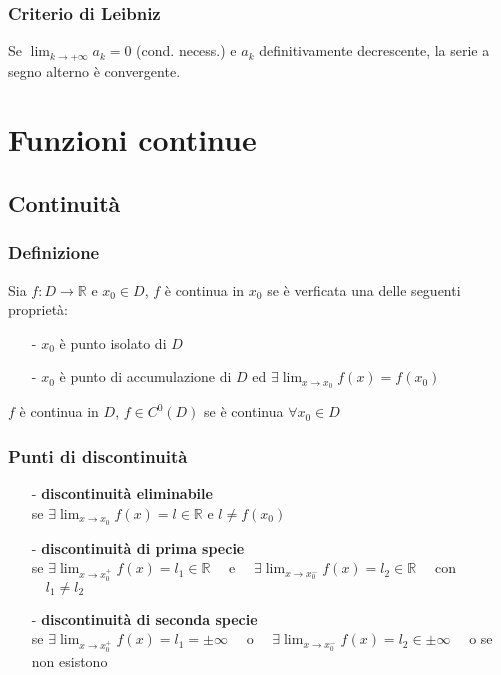 \documentclass[a4paper]{article}
\newcommand\cont[2]{C^{#1} \left({#2}\right)}
\begin{document}
\subsubsection*{Criterio di Leibniz}
Se \(\displaystyle \lim_{k \to +\infty} a_k = 0\) (cond. necess.) e \(a_k\) definitivamente decrescente, la serie a segno alterno è convergente.

\newpage


\section{Funzioni continue}
\subsection{Continuità}
\subsubsection*{Definizione}
Sia \(f:D \to \mathbb{R}\) e \(x_0 \in D\), \(f\) è continua in \(x_0\) se è verficata una delle seguenti proprietà:
\begin{itemize}
	\item[-] \(x_0\) è punto isolato di \(D\)
	\item[-] \(x_0\) è punto di accumulazione di \(D\) ed \(\displaystyle \exists \lim_{x \to x_0} f(x) = f(x_0)\)
\end{itemize}
\(f\) è continua in \(D\), \(f \in \cont{0}{D}\) se è continua \(\forall x_0 \in D\)

\subsubsection*{Punti di discontinuità}
\begin{itemize}
	\item[-] \textbf{discontinuità eliminabile} \\
	se \(\displaystyle \exists \lim_{x \to x_0} f(x) = l \in \mathbb{R}\) e \(l \neq f(x_0)\)
	\item[-] \textbf{discontinuità di prima specie} \\
	se \(\displaystyle \exists \lim_{x \to x_0^+} f(x) = l_1 \in \mathbb{R} \quad\) e \(\displaystyle \quad \exists \lim_{x \to x_0^-} f(x) = l_2 \in \mathbb{R} \quad\) con \(\quad l_1 \neq l_2\)
	\item[-] \textbf{discontinuità di seconda specie} \\
	se \(\displaystyle \exists \lim_{x \to x_0^+} f(x) = l_1 = \pm \infty \quad\) o \(\displaystyle \quad \exists \lim_{x \to x_0^-} f(x) = l_2 \in \pm \infty \quad\) o se non esistono
	
\end{itemize}
\end{document}
